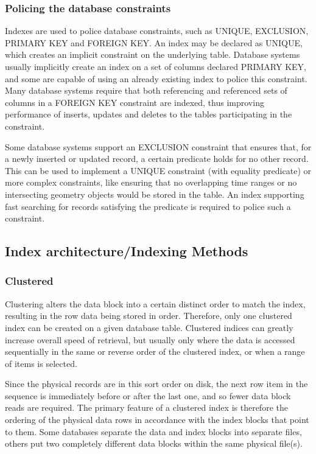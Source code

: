 \subsubsection{Policing the database constraints}
Indexes are used to police database constraints, such as UNIQUE, EXCLUSION, PRIMARY KEY and FOREIGN KEY. An index may be declared as UNIQUE, which creates an implicit constraint on the underlying table. Database systems usually implicitly create an index on a set of columns declared PRIMARY KEY, and some are capable of using an already existing index to police this constraint. Many database systems require that both referencing and referenced sets of columns in a FOREIGN KEY constraint are indexed, thus improving performance of inserts, updates and deletes to the tables participating in the constraint.

Some database systems support an EXCLUSION constraint that ensures that, for a newly inserted or updated record, a certain predicate holds for no other record. This can be used to implement a UNIQUE constraint (with equality predicate) or more complex constraints, like ensuring that no overlapping time ranges or no intersecting geometry objects would be stored in the table. An index supporting fast searching for records satisfying the predicate is required to police such a constraint.

\subsection{Index architecture/Indexing Methods}

\subsubsection{Clustered}
Clustering alters the data block into a certain distinct order to match the index, resulting in the row data being stored in order. Therefore, only one clustered index can be created on a given database table. Clustered indices can greatly increase overall speed of retrieval, but usually only where the data is accessed sequentially in the same or reverse order of the clustered index, or when a range of items is selected.

Since the physical records are in this sort order on disk, the next row item in the sequence is immediately before or after the last one, and so fewer data block reads are required. The primary feature of a clustered index is therefore the ordering of the physical data rows in accordance with the index blocks that point to them. Some databases separate the data and index blocks into separate files, others put two completely different data blocks within the same physical file(s).

